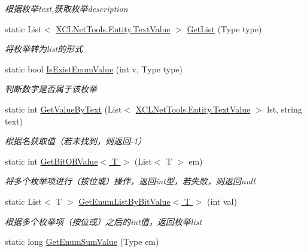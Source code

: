 \begin{DoxyCompactItemize}
\begin{DoxyCompactList}\small\item\em 根据枚举text,获取枚举description \end{DoxyCompactList}\item 
static List$<$ \hyperlink{class_x_c_l_net_tools_1_1_entity_1_1_text_value}{X\+C\+L\+Net\+Tools.\+Entity.\+Text\+Value} $>$ \hyperlink{class_x_c_l_net_tools_1_1_enum_1_1_enum_helper_a0f98e6348aacd00a6254794e6565c173}{Get\+List} (Type type)
\begin{DoxyCompactList}\small\item\em 将枚举转为list的形式 \end{DoxyCompactList}\item 
static bool \hyperlink{class_x_c_l_net_tools_1_1_enum_1_1_enum_helper_a364b52512aee90c0f2530745f4127047}{Is\+Exist\+Enum\+Value} (int v, Type type)
\begin{DoxyCompactList}\small\item\em 判断数字是否属于该枚举 \end{DoxyCompactList}\item 
static int \hyperlink{class_x_c_l_net_tools_1_1_enum_1_1_enum_helper_ab5d340064717d8cf3c9c6036d3770b1f}{Get\+Value\+By\+Text} (List$<$ \hyperlink{class_x_c_l_net_tools_1_1_entity_1_1_text_value}{X\+C\+L\+Net\+Tools.\+Entity.\+Text\+Value} $>$ lst, string text)
\begin{DoxyCompactList}\small\item\em 根据名获取值（若未找到，则返回-\/1） \end{DoxyCompactList}\item 
static int \hyperlink{class_x_c_l_net_tools_1_1_enum_1_1_enum_helper_a8ee641787655d2b4f06cb51486ea8be3}{Get\+Bit\+O\+R\+Value$<$ T $>$} (List$<$ T $>$ em)
\begin{DoxyCompactList}\small\item\em 将多个枚举项进行（按位或）操作，返回int型，若失败，则返回null \end{DoxyCompactList}\item 
static List$<$ T $>$ \hyperlink{class_x_c_l_net_tools_1_1_enum_1_1_enum_helper_a7023c3a9e2c46de0cdeed71bce2cfb6a}{Get\+Enum\+List\+By\+Bit\+Value$<$ T $>$} (int val)
\begin{DoxyCompactList}\small\item\em 根据多个枚举项（按位或）之后的int值，返回枚举list \end{DoxyCompactList}\item 
static long \hyperlink{class_x_c_l_net_tools_1_1_enum_1_1_enum_helper_a43bf704153939cd6950d5d88e072c691}{Get\+Enum\+Sum\+Value} (Type em)

\end{DoxyCompactItemize}
